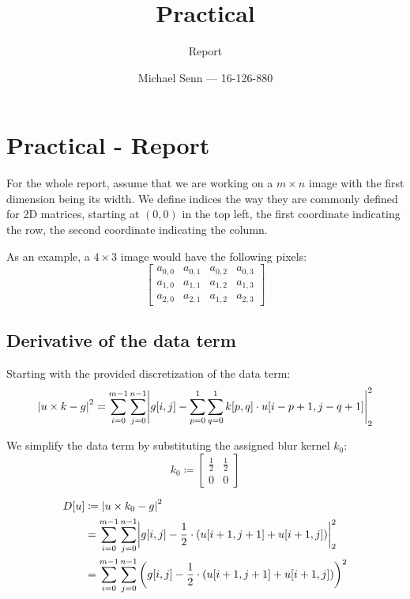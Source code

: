 \documentclass[a4paper]{scrreprt}
\title{Practical \series}
\subtitle{Report}
\author{Michael Senn \maillink{michael.senn@students.unibe.ch} --- 16-126-880}
\date{\printdate}
\DeclarePairedDelimiter\abs{\lvert}{\rvert}
\newcommand{\series}{01}
\begin{document}
\maketitle


\setcounter{chapter}{\numexpr \series - 1 \relax}

\chapter{Practical - Report}

For the whole report, assume that we are working on a $m \times n$ image with
the first dimension being its width. We define indices the way they are
commonly defined for 2D matrices, starting at $(0, 0)$ in the top left, the
first coordinate indicating the row, the second coordinate indicating the
column.

As an example, a $4 \times 3$ image would have the following pixels:
\[
		\begin{bmatrix}
				a_{0, 0} & a_{0, 1} & a_{0, 2} & a_{0, 3} \\
				a_{1, 0} & a_{1, 1} & a_{1, 2} & a_{1, 3} \\
				a_{2, 0} & a_{2, 1} & a_{1, 2} & a_{2, 3}
		\end{bmatrix}
\]

\section{Derivative of the data term}

Starting with the provided discretization of the data term:
\[
		\abs*{u \times k - g}^2 = \sum_{i=0}^{m-1} \sum_{j=0}^{n-1} \abs*{g[i, j] - \sum_{p=0}^{1} \sum_{q=0}^{1} k[p, q] \cdot u[i - p + 1, j - q + 1]}_2^2
\]

We simplify the data term by substituting the assigned blur kernel $k_0$:
\[
		k_0 \coloneqq \begin{bmatrix}
				\frac{1}{2} & \frac{1}{2} \\
				0 & 0
		\end{bmatrix}
\]

\begin{align*}
		D[u] & \coloneqq \abs*{u \times k_0 - g}^2 \\ 
			 & = \sum_{i=0}^{m-1} \sum_{j=0}^{n-1} \abs*{g[i, j] - \frac{1}{2} \cdot (u[i + 1, j + 1] + u[i + 1, j])}_2^2 \\
			 & = \sum_{i=0}^{m-1} \sum_{j=0}^{n-1} \left(g[i, j] - \frac{1}{2} \cdot (u[i + 1, j + 1] + u[i + 1, j])\right)^2
\end{align*}
\end{document}

